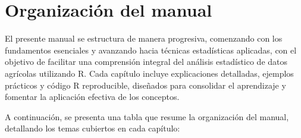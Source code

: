 \documentclass[
  spanish,
  letterpaper,
]{book}
\begin{document}
\section*{Organización del manual}\label{organizaciuxf3n-del-manual}


El presente manual se estructura de manera progresiva, comenzando con
los fundamentos esenciales y avanzando hacia técnicas estadísticas
aplicadas, con el objetivo de facilitar una comprensión integral del
análisis estadístico de datos agrícolas utilizando R. Cada capítulo
incluye explicaciones detalladas, ejemplos prácticos y código R
reproducible, diseñados para consolidar el aprendizaje y fomentar la
aplicación efectiva de los conceptos.

A continuación, se presenta una tabla que resume la organización del
manual, detallando los temas cubiertos en cada capítulo:
\end{document}
